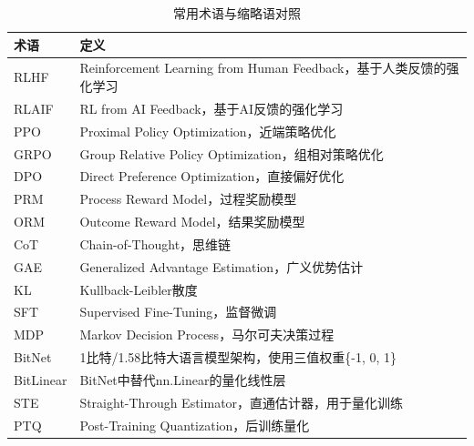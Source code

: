 \documentclass[12pt,a4paper]{article}
\begin{document}
\begin{table}[H]
\centering
\caption{常用术语与缩略语对照}
\begin{tabular}{lp{10cm}}
\toprule
\textbf{术语} & \textbf{定义} \\
\midrule
RLHF & Reinforcement Learning from Human Feedback，基于人类反馈的强化学习 \\
RLAIF & RL from AI Feedback，基于AI反馈的强化学习 \\
PPO & Proximal Policy Optimization，近端策略优化 \\
GRPO & Group Relative Policy Optimization，组相对策略优化 \\
DPO & Direct Preference Optimization，直接偏好优化 \\
PRM & Process Reward Model，过程奖励模型 \\
ORM & Outcome Reward Model，结果奖励模型 \\
CoT & Chain-of-Thought，思维链 \\
GAE & Generalized Advantage Estimation，广义优势估计 \\
KL & Kullback-Leibler散度 \\
SFT & Supervised Fine-Tuning，监督微调 \\
MDP & Markov Decision Process，马尔可夫决策过程 \\
BitNet & 1比特/1.58比特大语言模型架构，使用三值权重\{-1, 0, 1\} \\
BitLinear & BitNet中替代nn.Linear的量化线性层 \\
STE & Straight-Through Estimator，直通估计器，用于量化训练 \\
PTQ & Post-Training Quantization，后训练量化 \\
\bottomrule
\end{tabular}
\end{table}
\end{document}
